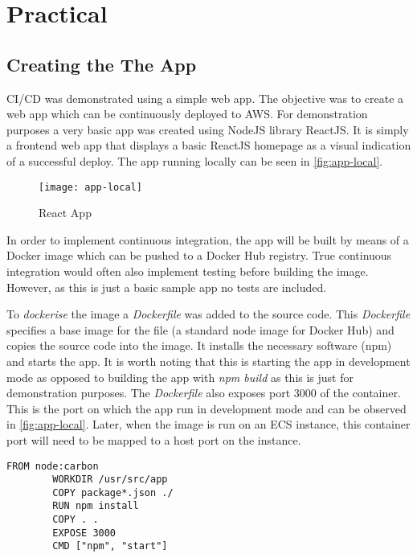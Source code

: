 \section{Practical}
	\subsection{Creating the The App}
		CI/CD was demonstrated using a simple web app. The objective was to create a web app which can be continuously deployed to AWS. For demonstration purposes a very basic app was created using NodeJS library ReactJS. It is simply a frontend web app that displays a basic ReactJS homepage as a visual indication of a successful deploy. The app running locally can be seen in \autoref{fig:app-local}.
		\begin{figure}[H]
			\caption{React App}
			\centering
			\texttt{[image: app-local]}
			\label{fig:app-local}
		\end{figure}
		In order to implement continuous integration, the app will be built by means of a Docker image which can be pushed to a Docker Hub registry. True continuous integration would often also implement testing before building the image\citep{docker}. However, as this is just a basic sample app no tests are included.
		
		To \textit{dockerise} the image a \textit{Dockerfile} was added to the source code. This \textit{Dockerfile} specifies a base image for the file (a standard node image for Docker Hub) and copies the source code into the image. It installs the necessary software (npm) and starts the app. It is worth noting that this is starting the app in development mode as opposed to building the app with \textit{npm build} as this is just for demonstration purposes. The \textit{Dockerfile} also exposes port 3000 of the container. This is the port on which the app run in development mode and can be observed in \autoref{fig:app-local}. Later, when the image is run on an ECS instance, this container port will need to be mapped to a host port on the instance.
		
		\begin{minipage}{\textwidth}
		\begin{lstlisting}[caption={Dockerfile}]
		FROM node:carbon
		WORKDIR /usr/src/app
		COPY package*.json ./
		RUN npm install
		COPY . .
		EXPOSE 3000
		CMD ["npm", "start"]
		\end{lstlisting}
		\end{minipage}
	
